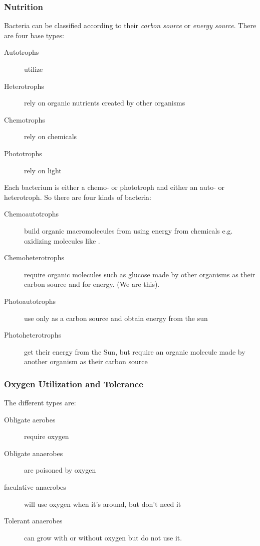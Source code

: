 \documentclass[../Bio_chemistryReview.tex]{subfiles}
\begin{document}
\subsubsection{Nutrition}
Bacteria can be classified according to their \textit{carbon source} or
\textit{energy source}. There are four base types:
\begin{description}
    \item[Autotrophs] utilize 
    \item[Heterotrophs]  rely on organic nutrients created by other organisms
    \item[Chemotrophs] rely on chemicals
    \item[Phototrophs] rely on light
\end{description}
Each bacterium is either a chemo- or phototroph and either an auto- or
heterotroph. So there are four kinds of bacteria:
\begin{description}
    \item[Chemoautotrophs] build organic macromolecules from  using
        energy from chemicals e.g. oxidizing molecules like .
    \item[Chemoheterotrophs] require organic molecules such as glucose made by
        other organisms as their carbon source and for energy. (We are this).
    \item[Photoautotrophs] use only  as a carbon source and obtain
        energy from the sun
    \item[Photoheterotrophs] get their energy from the Sun, but require an
        organic molecule made by another organism as their carbon source
\end{description}

\subsubsection{Oxygen Utilization and Tolerance}
The different types are:
\begin{description}
    \item[Obligate aerobes] require oxygen
    \item[Obligate anaerobes] are poisoned by oxygen
    \item[faculative anaerobes] will use oxygen when it's around, but don't need
        it
    \item[Tolerant anaerobes] can grow with or without oxygen but do not use it.
\end{description}
\end{document}
